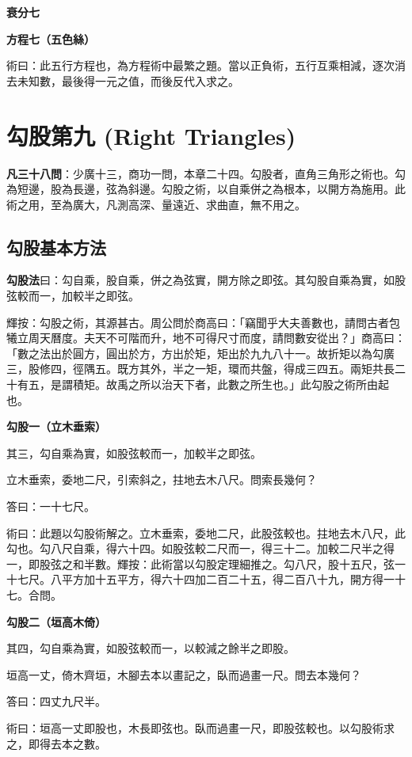 \documentclass[11pt,a4paper]{article}
\newenvironment{problemenv}[1]{%
  \medskip\noindent\textbf{#1}\par\nopagebreak\smallskip
}{\medskip}
\begin{document}
\begin{problemenv}{衰分七}
\begin{problemenv}{方程七（五色絲）}
\textsf{術曰：}此五行方程也，為方程術中最繁之題。當以正負術，五行互乘相減，逐次消去未知數，最後得一元之值，而後反代入求之。
\end{problemenv}

\newpage
\section{勾股第九 (Right Triangles)}

\textbf{凡三十八問}：少廣十三，商功一問，本章二十四。勾股者，直角三角形之術也。勾為短邊，股為長邊，弦為斜邊。勾股之術，以自乘併之為根本，以開方為施用。此術之用，至為廣大，凡測高深、量遠近、求曲直，無不用之。

\subsection{勾股基本方法}

\textbf{勾股法}曰：勾自乘，股自乘，併之為弦實，開方除之即弦。其勾股自乘為實，如股弦較而一，加較半之即弦。

輝按：勾股之術，其源甚古。周公問於商高曰：「竊聞乎大夫善數也，請問古者包犧立周天曆度。夫天不可階而升，地不可得尺寸而度，請問數安從出？」商高曰：「數之法出於圓方，圓出於方，方出於矩，矩出於九九八十一。故折矩以為勾廣三，股修四，徑隅五。既方其外，半之一矩，環而共盤，得成三四五。兩矩共長二十有五，是謂積矩。故禹之所以治天下者，此數之所生也。」此勾股之術所由起也。

\begin{problemenv}{勾股一（立木垂索）}
其三，勾自乘為實，如股弦較而一，加較半之即弦。

立木垂索，委地二尺，引索斜之，拄地去木八尺。問索長幾何？

\textsf{答曰：}一十七尺。

\textsf{術曰：}此題以勾股術解之。立木垂索，委地二尺，此股弦較也。拄地去木八尺，此勾也。勾八尺自乘，得六十四。如股弦較二尺而一，得三十二。加較二尺半之得一，即股弦之和半數。輝按：此術當以勾股定理細推之。勾八尺，股十五尺，弦一十七尺。八平方加十五平方，得六十四加二百二十五，得二百八十九，開方得一十七。合問。
\end{problemenv}

\begin{problemenv}{勾股二（垣高木倚）}
其四，勾自乘為實，如股弦較而一，以較減之餘半之即股。

垣高一丈，倚木齊垣，木腳去本以畫記之，臥而過畫一尺。問去本幾何？

\textsf{答曰：}四丈九尺半。

\textsf{術曰：}垣高一丈即股也，木長即弦也。臥而過畫一尺，即股弦較也。以勾股術求之，即得去本之數。
\end{problemenv}


\end{problemenv}
\end{document}

